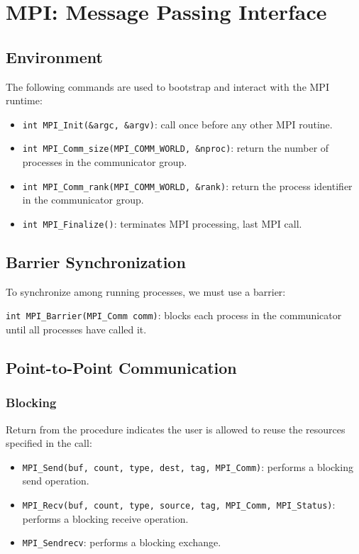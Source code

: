 \section{MPI: Message Passing Interface}

\subsection{Environment}
The following commands are used to bootstrap and interact with the MPI runtime:
\begin{itemize}
    \item \texttt{int MPI\_Init(\&argc, \&argv)}: call once before any other MPI routine.
    \item \texttt{int MPI\_Comm\_size(MPI\_COMM\_WORLD, \&nproc)}: return the number of processes in the communicator group.
    \item \texttt{int MPI\_Comm\_rank(MPI\_COMM\_WORLD, \&rank)}: return the process identifier in the communicator group.
    \item \texttt{int MPI\_Finalize()}: terminates MPI processing, last MPI call.
\end{itemize}

\subsection{Barrier Synchronization}
To synchronize among running processes, we must use a barrier:

\texttt{int MPI\_Barrier(MPI\_Comm comm)}: blocks each process in the communicator until all processes have called it.

\subsection{Point-to-Point Communication}

\subsubsection*{Blocking}
Return from the procedure indicates the user is allowed to reuse the resources specified in the call:
\begin{itemize}
    \item \texttt{MPI\_Send(buf, count, type, dest, tag, MPI\_Comm)}: performs a blocking send operation.
    \item \texttt{MPI\_Recv(buf, count, type, source, tag, MPI\_Comm, MPI\_Status)}: performs a blocking receive operation.
    \item \texttt{MPI\_Sendrecv}: performs a blocking exchange.
\end{itemize}

